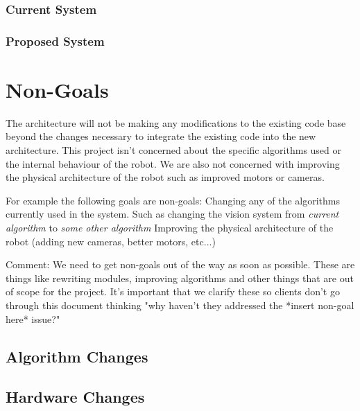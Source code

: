 \documentclass[english,12pt]{scrartcl}
\begin{document}
        	\subsubsection{Current System}
			\subsubsection{Proposed System}
        
    \section{Non-Goals}
        The architecture will not be making any modifications to the existing code base beyond the
        changes necessary to integrate the existing code into the new architecture. This project
        isn't concerned about the specific algorithms used or the internal behaviour of the robot.
        We are also not concerned with improving the physical architecture of the robot such as
        improved motors or cameras.
    
        For example the following goals are non-goals:
        Changing any of the algorithms currently used in the system. Such as changing the vision
        system from \emph{current algorithm} to \emph{some other algorithm} Improving the physical
        architecture of the robot (adding new cameras, better motors, etc...)
        
        Comment: We need to get non-goals out of the way as soon as possible. These are things like
        rewriting modules, improving algorithms and other things that are out of scope for the
        project. It's important that we clarify these so clients don't go through this document
        thinking "why haven't they addressed the *insert non-goal here* issue?"
        
        \subsection{Algorithm Changes}
            
        \subsection{Hardware Changes}
        
\end{document}
